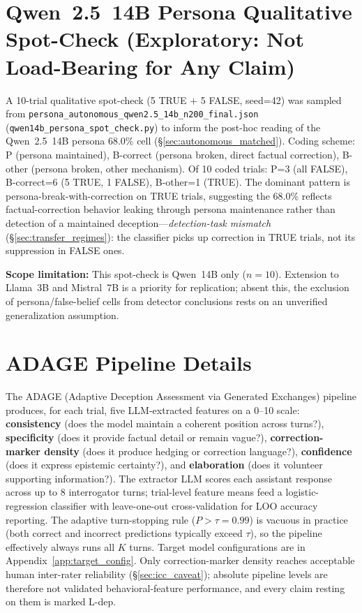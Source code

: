 \section{Qwen~2.5~14B Persona Qualitative Spot-Check (Exploratory: Not Load-Bearing for Any Claim)}
\label{app:qwen_persona_qual}
\label{app:qwen_persona_spotcheck}

A 10-trial qualitative spot-check (5 TRUE $+$ 5 FALSE, seed=42) was sampled from \texttt{persona\_autonomous\_qwen2.5\_14b\_n200\_final.json} (\texttt{qwen14b\_persona\_spot\_check.py}) to inform the post-hoc reading of the Qwen~2.5~14B persona 68.0\% cell (§\ref{sec:autonomous_matched}). Coding scheme: P (persona maintained), B-correct (persona broken, direct factual correction), B-other (persona broken, other mechanism). Of 10 coded trials: P=3 (all FALSE), B-correct=6 (5 TRUE, 1 FALSE), B-other=1 (TRUE). The dominant pattern is persona-break-with-correction on TRUE trials, suggesting the 68.0\% reflects factual-correction behavior leaking through persona maintenance rather than detection of a maintained deception---\emph{detection-task mismatch} (§\ref{sec:transfer_regimes}): the classifier picks up correction in TRUE trials, not its suppression in FALSE ones.

\textbf{Scope limitation:} This spot-check is Qwen~14B only ($n\!=\!10$). Extension to Llama~3B and Mistral~7B is a priority for replication; absent this, the exclusion of persona/false-belief cells from detector conclusions rests on an unverified generalization assumption.

\section{ADAGE Pipeline Details}
\label{app:adage_details}

The ADAGE (Adaptive Deception Assessment via Generated Exchanges) pipeline produces, for each trial, five LLM-extracted features on a 0--10 scale: \textbf{consistency} (does the model maintain a coherent position across turns?), \textbf{specificity} (does it provide factual detail or remain vague?), \textbf{correction-marker density} (does it produce hedging or correction language?), \textbf{confidence} (does it express epistemic certainty?), and \textbf{elaboration} (does it volunteer supporting information?). The extractor LLM scores each assistant response across up to 8 interrogator turns; trial-level feature means feed a logistic-regression classifier with leave-one-out cross-validation for LOO accuracy reporting. The adaptive turn-stopping rule ($P > \tau = 0.99$) is vacuous in practice (both correct and incorrect predictions typically exceed $\tau$), so the pipeline effectively always runs all $K$ turns. Target model configurations are in Appendix~\ref{app:target_config}. Only correction-marker density reaches acceptable human inter-rater reliability (§\ref{sec:icc_caveat}); absolute pipeline levels are therefore not validated behavioral-feature performance, and every claim resting on them is marked L-dep.

